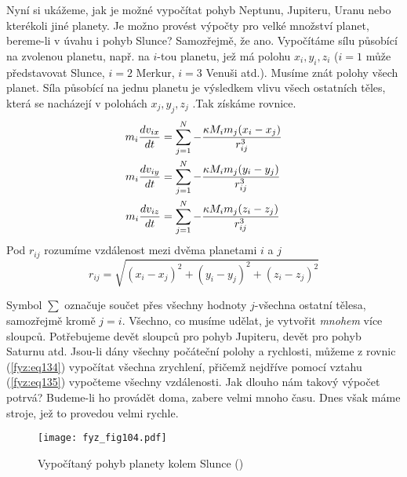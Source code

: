     Nyní si ukážeme, jak je možné vypočítat pohyb Neptunu, Jupiteru, Uranu nebo kterékoli jiné 
    planety. Je možno provést výpočty pro velké množství planet, bereme-li v úvahu i pohyb Slunce? 
    Samozřejmě, že ano. Vypočítáme sílu působící na zvolenou planetu, např. na \(i\)-tou planetu, 
    jež má polohu \(x_i, y_i, z_i\) (\(i = 1\) může představovat Slunce, \(i = 2\) Merkur, \(i = 
    3\) Venuši atd.). Musíme znát polohy všech planet. Síla působící na jednu planetu je výsledkem 
    vlivu všech ostatních těles, která se nacházejí v polohách \(x_j, y_j, z_j\) .Tak získáme 
    rovnice.
    \begin{subequations}
      \label{fyz:eq134}
      \begin{align}
        m_i\dfrac{d v_{ix}}{d t} 
          &= \sum_{j=1}^N - \frac{\kappa M_im_j(x_i - x_j)}{r_{ij}^3}  \label{fyz:eq134a}  \\
        m_i\dfrac{d v_{iy}}{d t} 
          &= \sum_{j=1}^N - \frac{\kappa M_im_j(y_i - y_j)}{r_{ij}^3}  \label{fyz:eq134b}  \\
        m_i\dfrac{d v_{iz}}{d t} 
          &= \sum_{j=1}^N - \frac{\kappa M_im_j(z_i - z_j)}{r_{ij}^3}  \label{fyz:eq134c}  
      \end{align}
    \end{subequations}
    Pod \(r_{ij}\) rozumíme vzdálenost mezi dvěma planetami \(i\) a \(j\)
    \begin{equation}\label{fyz:eq135}
      r_{ij} = \sqrt{(x_i-x_j)^2 + (y_i-y_j)^2 + (z_i-z_j)^2}
    \end{equation}
    
    Symbol \(\sum\) označuje součet přes všechny hodnoty \(j\)-všechna ostatní tělesa, samozřejmě 
    kromě \(j = i\). Všechno, co musíme udělat, je vytvořit \emph{mnohem} více sloupců. Potřebujeme 
    devět sloupců pro pohyb Jupiteru, devět pro pohyb Saturnu atd. Jsou-li dány všechny počáteční 
    polohy a rychlosti, můžeme z rovnic (\ref{fyz:eq134}) vypočítat všechna zrychlení, přičemž 
    nejdříve pomocí vztahu (\ref{fyz:eq135}) vypočteme všechny vzdálenosti. Jak dlouho nám takový 
    výpočet potrvá? Budeme-li ho provádět doma, zabere velmi mnoho času. Dnes však máme stroje, jež 
    to provedou velmi rychle.
    
    \begin{figure}[ht!]  %
      \centering
      \texttt{[image: fyz\_fig104.pdf]}
      \caption{Vypočítaný pohyb planety kolem Slunce (\cite[s.~134]{Feynman01})}
      \label{fyz:fig104}
    \end{figure}
    
